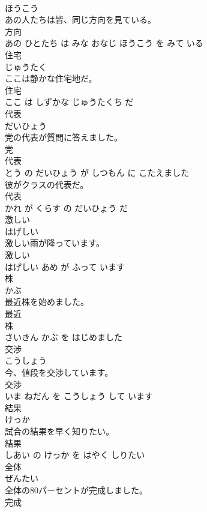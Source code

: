 \documentclass[8pt]{extreport}
\begin{document}
\begin{CJK}{UTF8}{min}
\\	ほうこう			
\\	あの人たちは皆、同じ方向を見ている。	
\\	方向 
\\	あの ひとたち は みな おなじ ほうこう を みて いる			
\\	住宅	
\\	じゅうたく			
\\	ここは静かな住宅地だ。	
\\	住宅 
\\	ここ は しずかな じゅうたくち だ			
\\	代表	
\\	だいひょう			
\\	党の代表が質問に答えました。	
\\	党 
\\	代表 
\\	とう の だいひょう が しつもん に こたえました			
\\	彼がクラスの代表だ。	
\\	代表 
\\	かれ が くらす の だいひょう だ			
\\	激しい	
\\	はげしい			
\\	激しい雨が降っています。	
\\	激しい 
\\	はげしい あめ が ふって います			
\\	株	
\\	かぶ			
\\	最近株を始めました。	
\\	最近 
\\	株 
\\	さいきん かぶ を はじめました			
\\	交渉	
\\	こうしょう			
\\	今、値段を交渉しています。	
\\	交渉 
\\	いま ねだん を こうしょう して います			
\\	結果	
\\	けっか			
\\	試合の結果を早く知りたい。	
\\	結果 
\\	しあい の けっか を はやく しりたい			
\\	全体	
\\	ぜんたい			
\\	全体の80パーセントが完成しました。	
\\	完成 

\end{CJK}
\end{document}
